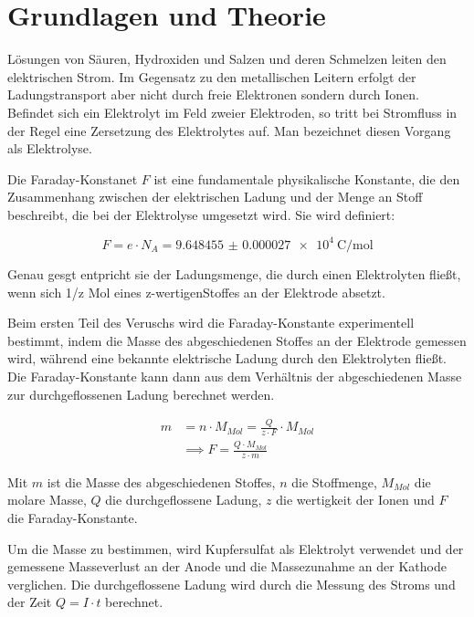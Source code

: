 \documentclass[12pt,a4paper,titlepage]{scrartcl}
\numberwithin{equation}{section}
\numberwithin{table}{section}
\numberwithin{figure}{section}
\begin{document}
\section{Grundlagen und Theorie}\label{sec:Grundlagen}
Lösungen von Säuren, Hydroxiden und Salzen und deren Schmelzen leiten den elektrischen Strom. Im Gegensatz zu den metallischen Leitern erfolgt der Ladungstransport aber nicht durch freie Elektronen sondern durch Ionen.
Befindet sich ein Elektrolyt im Feld zweier Elektroden, so tritt bei Stromfluss in der Regel eine Zersetzung des Elektrolytes auf. Man bezeichnet diesen Vorgang als Elektrolyse. \cite{PAPskript}

Die Faraday-Konstanet $F$ ist eine fundamentale physikalische Konstante, die den Zusammenhang zwischen der elektrischen Ladung und der Menge an Stoff beschreibt, die bei der Elektrolyse umgesetzt wird. 
Sie wird definiert:


\begin{equation}
    F = e \cdot N_A = \qty{9.648455(27)e4}{\coulomb\per\mol}
\end{equation}

Genau gesgt entpricht sie der Ladungsmenge, die durch einen Elektrolyten fließt, wenn sich 1/z Mol eines z-wertigenStoffes an der Elektrode absetzt. \cite{PAPskript}

Beim ersten Teil des Veruschs wird die Faraday-Konstante experimentell bestimmt, indem die Masse des abgeschiedenen Stoffes an der Elektrode gemessen wird, während eine bekannte elektrische Ladung durch den Elektrolyten fließt. Die Faraday-Konstante kann dann aus dem Verhältnis der abgeschiedenen Masse zur durchgeflossenen Ladung berechnet werden.


\begin{align}
    m &= n \cdot M_{Mol} = \frac{Q}{z \cdot F} \cdot M_{Mol} \\
    &\implies F = \frac{Q \cdot M_{Mol}}{z \cdot m} \label{eq:calc_masses}
\end{align}


Mit $m$ ist die Masse des abgeschiedenen Stoffes, $n$ die Stoffmenge, $M_{Mol}$ die molare Masse, $Q$ die durchgeflossene Ladung, $z$ die wertigkeit der Ionen und $F$ die Faraday-Konstante.

Um die Masse zu bestimmen, wird Kupfersulfat als Elektrolyt verwendet und der gemessene Masseverlust an der Anode und die Massezunahme an der Kathode verglichen. Die durchgeflossene Ladung wird durch die Messung des Stroms und der Zeit $Q = I \cdot t$ berechnet.
\end{document}
